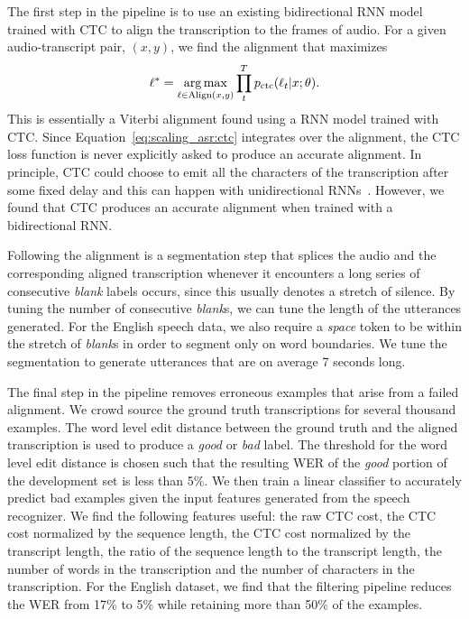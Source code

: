 The first step in the pipeline is to use an existing bidirectional RNN model
trained with CTC to align the transcription to the frames of audio. For a given
audio-transcript pair, $(x, y)$, we find the alignment that maximizes
\begin{equation*}
\ell^* = \operatorname*{arg\,max}_{\ell \in \text{Align}(x,y)} \prod_t^T p_{\text{ctc}}(\ell_t | x; \theta).
\end{equation*}
This is essentially a Viterbi alignment found using a RNN model trained with
CTC. Since Equation~\ref{eq:scaling_asr:ctc} integrates over the alignment, the
CTC loss function is never explicitly asked to produce an accurate alignment.
In principle, CTC could choose to emit all the characters of the transcription
after some fixed delay and this can happen with unidirectional
RNNs~\cite{sak2015}. However, we found that CTC produces an accurate alignment
when trained with a bidirectional RNN.

Following the alignment is a segmentation step that splices the audio and the
corresponding aligned transcription whenever it encounters a long series of
consecutive \emph{blank} labels occurs, since this usually denotes a stretch of
silence. By tuning the number of consecutive \emph{blank}s, we can tune the
length of the utterances generated. For the English speech data, we also
require a \emph{space} token to be within the stretch of \emph{blank}s in order
to segment only on word boundaries. We tune the segmentation to generate
utterances that are on average 7 seconds long.

The final step in the pipeline removes erroneous examples that arise from a
failed alignment. We crowd source the ground truth transcriptions for several
thousand examples. The word level edit distance between the ground truth and
the aligned transcription is used to produce a \emph{good} or \emph{bad} label.
The threshold for the word level edit distance is chosen such that the
resulting WER of the \emph{good} portion of the development set is less than
5\%. We then train a linear classifier to accurately predict bad examples given
the input features generated from the speech recognizer. We find the following
features useful: the raw CTC cost, the CTC cost normalized by the sequence
length, the CTC cost normalized by the transcript length, the ratio of the
sequence length to the transcript length, the number of words in the
transcription and the number of characters in the transcription. For the
English dataset, we find that the filtering pipeline reduces the WER from 17\%
to 5\% while retaining more than 50\% of the examples.

